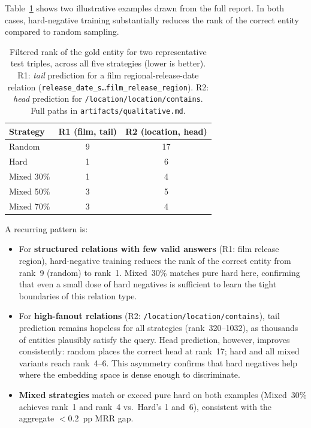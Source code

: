 \documentclass[10pt,twocolumn,letterpaper]{article}
\begin{document}
Table~\ref{tab:qualitative} shows two illustrative examples drawn from the
full report. In both cases, hard-negative training substantially reduces the
rank of the correct entity compared to random sampling.

\begin{table}[h]
\centering\scriptsize
\caption{Filtered rank of the gold entity for two representative test
triples, across all five strategies (lower is better).
R1: \emph{tail} prediction for a film regional-release-date relation
(\texttt{release\_date\_s\ldots film\_release\_region}).
R2: \emph{head} prediction for \texttt{/location/location/contains}.
Full paths in \texttt{artifacts/qualitative.md}.}
\label{tab:qualitative}
\begin{tabular}{@{}lcc@{}}
\toprule
Strategy   & R1 (film, tail) & R2 (location, head) \\
\midrule
Random     &  9 & 17 \\
Hard       &  1 &  6 \\
Mixed 30\% &  1 &  4 \\
Mixed 50\% &  3 &  5 \\
Mixed 70\% &  3 &  4 \\
\bottomrule
\end{tabular}
\end{table}

\noindent A recurring pattern is:
\begin{itemize}
  \item For \textbf{structured relations with few valid answers}
    (R1: film release region),
    hard-negative training reduces the rank of the correct entity
    from rank~9 (random) to rank~1.
    Mixed~30\% matches pure hard here, confirming that even a small dose
    of hard negatives is sufficient to learn the tight boundaries of
    this relation type.
  \item For \textbf{high-fanout relations}
    (R2: \texttt{/location/location/contains}),
    tail prediction remains hopeless for all strategies
    (rank~320--1032), as thousands of entities plausibly satisfy the
    query. Head prediction, however, improves consistently: random
    places the correct head at rank~17; hard and all mixed variants
    reach rank~4--6. This asymmetry confirms that hard negatives help
    where the embedding space is dense enough to discriminate.
  \item \textbf{Mixed strategies} match or exceed pure hard on both
    examples (Mixed~30\% achieves rank~1 and rank~4 vs.\ Hard's 1
    and~6), consistent with the aggregate $<\!0.2$~pp MRR gap.
\end{itemize}
\end{document}
